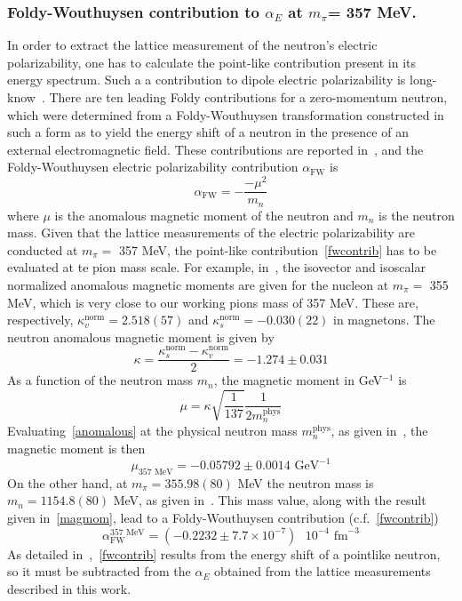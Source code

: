 \subsubsection{Foldy-Wouthuysen contribution to $\alpha_E$ at $m_\pi$= 357 MeV.}
In order to extract the lattice measurement of the neutron's electric polarizability,
one has to calculate the point-like contribution present in its energy spectrum. Such a 
a contribution to dipole electric polarizability is long-know~\cite{foldy}. There are ten
leading Foldy contributions for a zero-momentum neutron, which were determined
from a Foldy-Wouthuysen transformation constructed in such a form as to yield
the energy shift of a neutron in the presence of an external electromagnetic field.
These contributions are reported in~\cite{foldywouthuysen}, and the Foldy-Wouthuysen
electric polarizability contribution $\alpha_{\text{FW}}$ is
\begin{equation}
\alpha_{\text{FW}}=-\frac{-\mu^2}{m_n}
\label{fwcontrib}
\end{equation}
where $\mu$ is the anomalous magnetic moment of the neutron and $m_n$ is the 
neutron mass. Given that the lattice measurements of the electric polarizability are
conducted at $m_\pi=$ 357 MeV, the point-like contribution~\ref{fwcontrib} has to be
evaluated at te pion mass scale. For example, in~\cite{engelhardt4}, the isovector and
isoscalar normalized anomalous magnetic moments are given for the nucleon at 
$m_\pi=$ 355 MeV, which is very close to our working pions mass of 357 MeV. These are,
respectively, $\kappa_v^{\text{norm}}=2.518(57)$ and $\kappa_s^{\text{norm}}=-0.030(22)$
in magnetons. The neutron anomalous magnetic moment is given by
\begin{equation}
\kappa=\frac{\kappa_s^{\text{norm}}-\kappa_v^{\text{norm}}}{2}=-1.274\pm0.031
\end{equation}
As a function of the neutron mass $m_n$, the magnetic moment in GeV$^{-1}$ is
\begin{equation}
\mu=\kappa\sqrt{\frac{1}{137}}\frac{1}{2m_n^{\text{phys}}}
\label{anomalous}
\end{equation}
Evaluating~\ref{anomalous} at the physical neutron mass $m_n^{\text{phys}}$, as given 
in~\cite{PDG2017}, the magnetic moment is then
\begin{equation}
\mu_{357\text{ MeV}}=-0.05792\pm0.0014\text{ GeV}^{-1}
\label{magmom}
\end{equation}
On the other hand, at $m_\pi=355.98(80)$ MeV the neutron mass is $m_n=1154.8(80)$ 
MeV, as given in~\cite{bratt}. This mass value, along with the result given in~\ref{magmom}, lead to 
a Foldy-Wouthuysen contribution (c.f.~\ref{fwcontrib})
\begin{equation}
\alpha_{\text{FW}}^{357\text{ MeV}}=(-0.2232\pm7.7\times 10^{-7})\text{ }10^{-4}\text{ fm}^{-3}
\end{equation}
As detailed in~\cite{foldywouthuysen},~\ref{fwcontrib} results from the energy shift of a 
pointlike neutron, so it must be subtracted from the $\alpha_E$ obtained from the lattice 
measurements described in this work.
